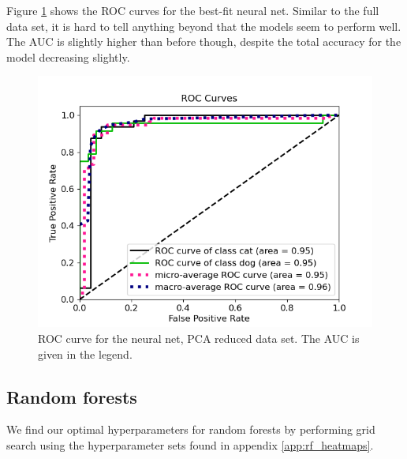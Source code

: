 \documentclass[a4paper]{article}
\begin{document}
Figure \ref{fig:nn_roc_pca} shows the ROC curves for the best-fit neural net. Similar to the full data set, it is hard to tell anything beyond that the models seem to perform well. The AUC is slightly higher than before though, despite the total accuracy for the model decreasing slightly.
\begin{figure}[H]
	\centering
	\includegraphics[scale=0.5]{../figures/neural_net/roc_nbins200_pca35_seed4155_ts0.20.png}
	\caption{ROC curve for the neural net, PCA reduced data set. The AUC is given in the legend.}
	\label{fig:nn_roc_pca}
\end{figure}	

\subsection{Random forests}
We find our optimal hyperparameters for random forests by performing grid search using the hyperparameter sets found in appendix \ref{app:rf_heatmaps}.
\end{document}
